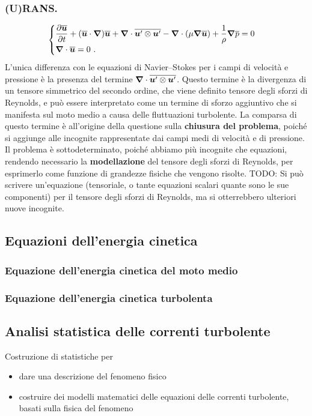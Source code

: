 \subsubsection{(U)RANS.}
\begin{equation}\label{eqn:urans}
\begin{cases}
 \dfrac{\partial{\overline{\bm{u}}}}{\partial{t}} + ( \overline{\bm{u}} \cdot \bm{\nabla} ) \overline{\bm{u}} + \bm{\nabla} \cdot \overline{\bm{u}' \otimes \bm{u}'} - \bm{\nabla} \cdot ( \mu \bm{\nabla} \overline{\bm{u}} ) + \dfrac{1}{\rho} \bm{\nabla} \overline{p} = 0 \\
 \bm{\nabla} \cdot \overline{\bm{u}} = 0 \ .
\end{cases}
\end{equation}
L'unica differenza con le equazioni di Navier--Stokes per i campi di velocità e pressione è la presenza del termine $\bm{\nabla} \cdot \overline{\bm{u}' \otimes \bm{u}'}$.
Questo termine è la divergenza di un tensore simmetrico del secondo ordine, che viene definito tensore degli sforzi di Reynolds, e può essere interpretato come un termine di sforzo aggiuntivo che si manifesta sul moto medio a causa delle fluttuazioni turbolente.
\newline
La comparsa di questo termine è all'origine della questione sulla \textbf{chiusura del problema}, poiché si aggiunge alle incognite rappresentate dai campi medi di velocità e di pressione. Il problema è sottodeterminato, poiché abbiamo più incognite che equazioni, rendendo necessario la \textbf{modellazione} del tensore degli sforzi di Reynolds, per esprimerlo come funzione di grandezze fisiche che vengono risolte.
{\color{red}TODO: Si può scrivere un'equazione (tensoriale, o tante equazioni scalari quante sono le sue componenti) per il tensore degli sforzi di Reynolds, ma si otterrebbero ulteriori nuove incognite.}

\subsection{Equazioni dell'energia cinetica}
\subsubsection{Equazione dell'energia cinetica del moto medio}
\subsubsection{Equazione dell'energia cinetica turbolenta}

\subsection{Analisi statistica delle correnti turbolente}
Costruzione di statistiche per
\begin{itemize}
 \item dare una descrizione del fenomeno fisico
 \item costruire dei modelli matematici delle equazioni delle correnti turbolente, basati sulla fisica del fenomeno
\end{itemize}

